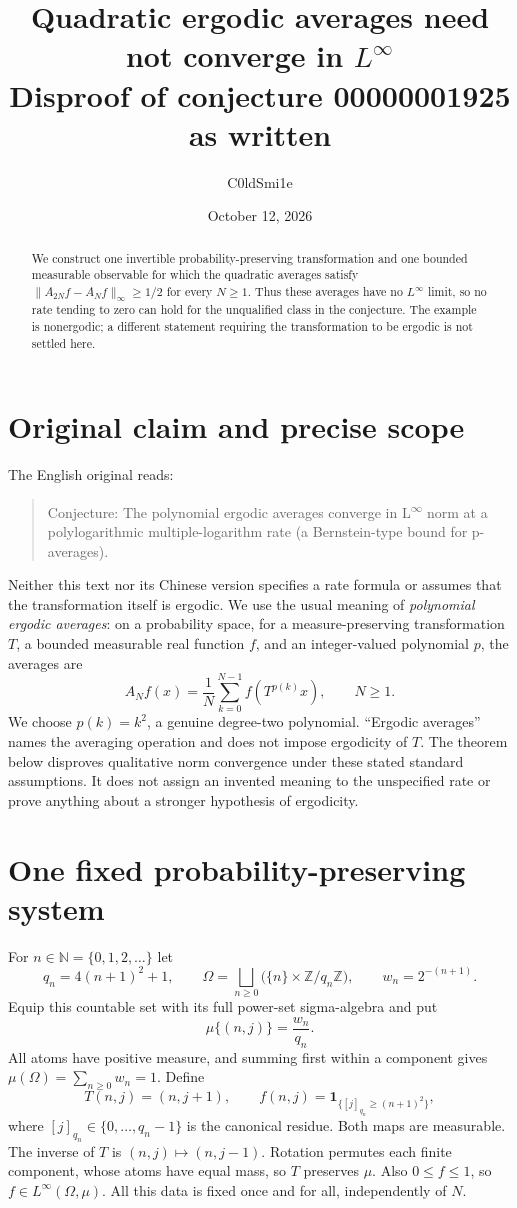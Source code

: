 \documentclass[11pt]{article}
\title{Quadratic ergodic averages need not converge in $L^\infty$\\
\large Disproof of conjecture 00000001925 as written}
\author{C0ldSmi1e}
\date{October 12, 2026}
\newcommand{\N}{\mathbb N}
\newcommand{\Z}{\mathbb Z}
\newcommand{\Linfty}{L^{\infty}(\Omega,\mu)}
\begin{document}
\maketitle
\begin{abstract}
We construct one invertible probability-preserving transformation and one bounded
measurable observable for which the quadratic averages satisfy
$\|A_{2N}f-A_Nf\|_\infty\geq 1/2$ for every $N\geq1$.
Thus these averages have no $L^\infty$ limit, so no rate tending to zero can hold
for the unqualified class in the conjecture. The example is nonergodic;
a different statement requiring the transformation to be ergodic is not settled here.
\end{abstract}

\section{Original claim and precise scope}
The English original reads:
\begin{quote}
Conjecture: The polynomial ergodic averages converge in L\textsuperscript{$\infty$}
norm at a polylogarithmic multiple-logarithm rate (a Bernstein-type bound for p-averages).
\end{quote}
Neither this text nor its Chinese version specifies a rate formula or assumes
that the transformation itself is ergodic. We use the usual meaning of
\emph{polynomial ergodic averages}: on a probability space, for a
measure-preserving transformation $T$, a bounded measurable real function $f$,
and an integer-valued polynomial $p$, the averages are
\[
 A_Nf(x)=\frac1N\sum_{k=0}^{N-1} f(T^{p(k)}x),\qquad N\geq1.
\]
We choose $p(k)=k^2$, a genuine degree-two polynomial. ``Ergodic averages''
names the averaging operation and does not impose ergodicity of $T$.
The theorem below disproves qualitative norm convergence under these stated
standard assumptions. It does not assign an invented meaning to the unspecified
rate or prove anything about a stronger hypothesis of ergodicity.

\section{One fixed probability-preserving system}
For $n\in\N=\{0,1,2,\ldots\}$ let
\[
 q_n=4(n+1)^2+1,\qquad
 \Omega=\bigsqcup_{n\geq0}\bigl(\{n\}\times\Z/q_n\Z\bigr),\qquad
 w_n=2^{-(n+1)}.
\]
Equip this countable set with its full power-set sigma-algebra and put
\[
 \mu\{(n,j)\}=\frac{w_n}{q_n}.
\]
All atoms have positive measure, and summing first within a component gives
$\mu(\Omega)=\sum_{n\geq0}w_n=1$.
Define
\[
 T(n,j)=(n,j+1),\qquad
 f(n,j)=\mathbf1_{\{[j]_{q_n}\geq(n+1)^2\}},
\]
where $[j]_{q_n}\in\{0,\ldots,q_n-1\}$ is the canonical residue.
Both maps are measurable. The inverse of $T$ is $(n,j)\mapsto(n,j-1)$.
Rotation permutes each finite component, whose atoms have equal mass, so
$T$ preserves $\mu$. Also $0\leq f\leq1$, so $f\in\Linfty$.
All this data is fixed once and for all, independently of $N$.
\end{document}
